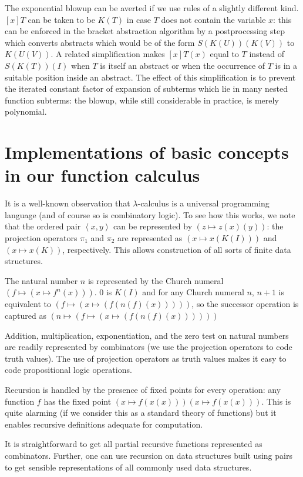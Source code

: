 \documentclass{article}
\begin{document}
The exponential blowup can be averted if we use rules of a slightly
different kind.  $[x]T$ can be taken to be $K(T)$ in case $T$ does not
contain the variable $x$: this can be enforced in the bracket
abstraction algorithm by a postprocessing step which converts
abstracts which would be of the form $S(K(U))(K(V))$ to $K(U(V))$.  A
related simplification makes $[x]T(x)$ equal to $T$ instead of
$S(K(T))(I)$ when $T$ is itself an abstract or when the occurrence of
$T$ is in a suitable position inside an abstract.  The effect of this
simplification is to prevent the iterated constant factor of expansion
of subterms which lie in many nested function subterms: the blowup,
while still considerable in practice, is merely polynomial.

\section{Implementations of basic concepts in our function calculus}

It is a well-known observation that $\lambda$-calculus is a universal
programming language (and of course so is combinatory logic).  To see
how this works, we note that the ordered pair $\left<x,y\right>$ can
be represented by $(z \mapsto z(x)(y))$: the projection operators
$\pi_1$ and $\pi_2$ are represented as $(x \mapsto x(K(I)))$ and $(x
\mapsto x(K))$, respectively.  This allows construction of all sorts
of finite data structures.

The natural number $n$ is represented by the Church numeral $(f \mapsto (x
\mapsto f^n(x)))$.  0 is $K(I)$ and for any Church numeral $n$, $n+1$
is equivalent to $(f \mapsto  (x \mapsto (f(n(f)(x)))))$, so the successor
operation is captured as $(n \mapsto (f \mapsto  (x \mapsto (f(n(f)(x))))))$

Addition, multiplication, exponentiation, and the zero test on natural
numbers are readily represented by combinators (we use the projection
operators to code truth values).  The use of projection operators as truth
values makes it easy to code propositional logic operations.

Recursion is handled by the presence of fixed points for every
operation: any function $f$ has the fixed point $(x \mapsto f(x(x)))(x
\mapsto f(x(x)))$.  This is quite alarming (if we consider this as a
standard theory of functions) but it enables recursive definitions
adequate for computation.

It is straightforward to get all partial recursive functions represented
as combinators.  Further, one can use recursion on data structures built using
pairs to get sensible representations of all commonly used data structures.
\end{document}
